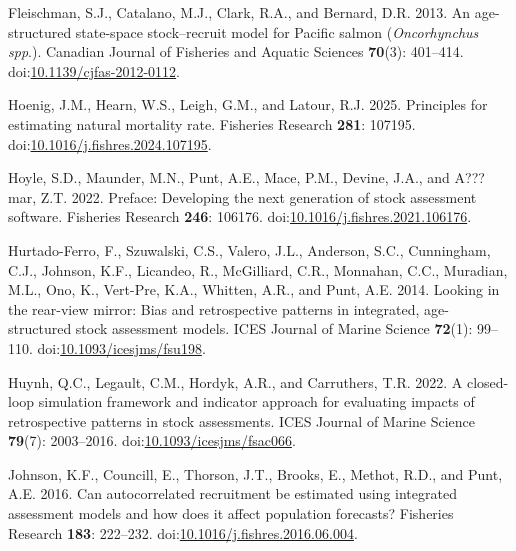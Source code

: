 \documentclass[
  12pt,
]{article}
\newlength{\cslhangindent}
\newlength{\cslentryspacingunit} %
\newenvironment{CSLReferences}[2] %
 {%
  \setlength{\parindent}{0pt}
  \ifodd #1
  \let\oldpar\par
  \def\par{\hangindent=\cslhangindent\oldpar}
  \fi
  \setlength{\parskip}{#2\cslentryspacingunit}
 }%
 {}
\begin{document}
\begin{CSLReferences}{1}{0}
\leavevmode{}%
Fleischman, S.J., Catalano, M.J., Clark, R.A., and Bernard, D.R. 2013.
An age-structured state-space stock--recruit model for {P}acific salmon
(\emph{{O}ncorhynchus spp}.). Canadian Journal of Fisheries and Aquatic
Sciences \textbf{70}(3): 401--414.
doi:\href{https://doi.org/10.1139/cjfas-2012-0112}{10.1139/cjfas-2012-0112}.

\leavevmode{}%
Hoenig, J.M., Hearn, W.S., Leigh, G.M., and Latour, R.J. 2025.
Principles for estimating natural mortality rate. Fisheries Research
\textbf{281}: 107195.
doi:\href{https://doi.org/10.1016/j.fishres.2024.107195}{10.1016/j.fishres.2024.107195}.

\leavevmode{}%
Hoyle, S.D., Maunder, M.N., Punt, A.E., Mace, P.M., Devine, J.A., and
A???mar, Z.T. 2022. Preface: Developing the next generation of stock
assessment software. Fisheries Research \textbf{246}: 106176.
doi:\href{https://doi.org/10.1016/j.fishres.2021.106176}{10.1016/j.fishres.2021.106176}.

\leavevmode{}%
Hurtado-Ferro, F., Szuwalski, C.S., Valero, J.L., Anderson, S.C.,
Cunningham, C.J., Johnson, K.F., Licandeo, R., McGilliard, C.R.,
Monnahan, C.C., Muradian, M.L., Ono, K., Vert-Pre, K.A., Whitten, A.R.,
and Punt, A.E. 2014. Looking in the rear-view mirror: Bias and
retrospective patterns in integrated, age-structured stock assessment
models. ICES Journal of Marine Science \textbf{72}(1): 99--110.
doi:\href{https://doi.org/10.1093/icesjms/fsu198}{10.1093/icesjms/fsu198}.

\leavevmode{}%
Huynh, Q.C., Legault, C.M., Hordyk, A.R., and Carruthers, T.R. 2022. A
closed-loop simulation framework and indicator approach for evaluating
impacts of retrospective patterns in stock assessments. ICES Journal of
Marine Science \textbf{79}(7): 2003--2016.
doi:\href{https://doi.org/10.1093/icesjms/fsac066}{10.1093/icesjms/fsac066}.

\leavevmode{}%
Johnson, K.F., Councill, E., Thorson, J.T., Brooks, E., Methot, R.D.,
and Punt, A.E. 2016. Can autocorrelated recruitment be estimated using
integrated assessment models and how does it affect population
forecasts? Fisheries Research \textbf{183}: 222--232.
doi:\href{https://doi.org/10.1016/j.fishres.2016.06.004}{10.1016/j.fishres.2016.06.004}.


\end{CSLReferences}
\end{document}
